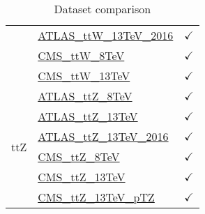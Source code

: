 \documentclass{article}
\begin{document}
\begin{table}[H]
\begin{tabular}{|c|l|c|}
 & \href{https://arxiv.org/abs/1901.03584}{ATLAS_ttW_13TeV_2016}  & $\checkmark$\\ \cline{2-3}
 & \href{https://arxiv.org/abs/1510.01131}{CMS_ttW_8TeV}  & $\checkmark$\\ \cline{2-3}
 & \href{https://arxiv.org/abs/1711.02547}{CMS_ttW_13TeV}  & $\checkmark$
\\ \hline
\multirow{6}{*}{ttZ}
 & \href{https://arxiv.org/abs/1509.05276}{ATLAS_ttZ_8TeV}  & $\checkmark$\\ \cline{2-3}
 & \href{https://arxiv.org/abs/1609.01599}{ATLAS_ttZ_13TeV}  & $\checkmark$\\ \cline{2-3}
 & \href{https://arxiv.org/abs/1901.03584}{ATLAS_ttZ_13TeV_2016}  & $\checkmark$\\ \cline{2-3}
 & \href{https://arxiv.org/abs/1510.01131}{CMS_ttZ_8TeV}  & $\checkmark$\\ \cline{2-3}
 & \href{https://arxiv.org/abs/1711.02547}{CMS_ttZ_13TeV}  & $\checkmark$\\ \cline{2-3}
 & \href{https://arxiv.org/abs/1907.11270}{CMS_ttZ_13TeV_pTZ}  & $\checkmark$
\\ \hline
\end{tabular}
\caption{Dataset comparison}
\end{table}
\end{document}
